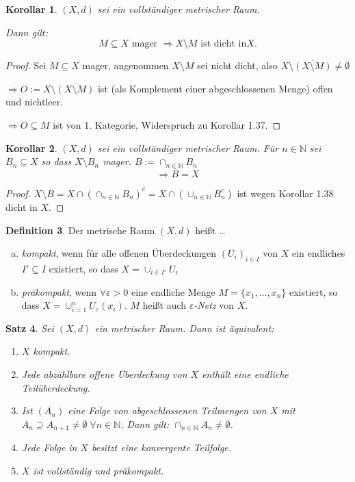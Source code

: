 \documentclass[ngerman]{report}
\theoremstyle{plain}%
\newtheorem{thm}{Satz}[chapter]
\newtheorem{cor}[thm]{Korollar}
\theoremstyle{definition}%
\newtheorem{definition}[thm]{Definition}
\theoremstyle{myStyle}
\newcommand{\N}{\mathbb{N}}
\newcommand{\df}[1][]{%
	\overset{#1}{\Rightarrow}
}
\begin{document}
\begin{cor}
	$(X,d)$ sei ein vollständiger metrischer Raum.\par 
	Dann gilt: 
	$$ M\subseteq X \text{ mager } \df X\setminus M \text{ ist dicht in} X.$$
\end{cor}
\begin{proof}
	Sei $M\subseteq X$ mager, angenommen $X\setminus M$ sei nicht dicht, also
	$X\setminus \overline{(X\setminus M)}\not= \emptyset$\par 
	$\df O:=X\setminus \overline{(X\setminus M)}$ ist (als Komplement einer abgeschlossenen Menge) offen und nichtleer.\par 
	$\df O \subseteq M$ ist von 1. Kategorie, Widerspruch zu Korollar 1.37.
\end{proof}

\begin{cor}
	$(X,d)$ sei ein vollständiger metrischer Raum. Für $n\in\N$ sei $B_n \subseteq X$ so dass $X\setminus B_n$ mager. $B:=\cap_{n\in\N}  B_n$
	$$\df \overline{B} = X$$
\end{cor}
\begin{proof}
	$X\setminus{B} = X\cap (\cap_{n\in\N} B_n)^c = X \cap (\cup_{n\in\N} B_n^c)$ ist wegen Korollar 1.38 dicht in $X$.
\end{proof}

\begin{definition}
	Der metrische Raum $(X,d)$ heißt \dots
	\begin{enumerate}[(a)]
	\item \textit{kompakt}, wenn für alle offenen Überdeckungen $(U_i)_{i\in I}$ von $X$ ein endliches $I'\subseteq I$ existiert, so dass $X = \cup_{i\in I'} U_i$
	
	\item \textit{präkompakt}, wenn $\forall \varepsilon > 0$ eine endliche Menge $M = \{x_1,\dots, x_n\}$ existiert, so dass $X = \cup^n_{i=1} U_\varepsilon (x_i)$. $M$ heißt auch $\varepsilon$\textit{-Netz} von $X$.
\end{enumerate}		
\end{definition}

\begin{thm}
	Sei $(X,d)$ ein metrischer Raum. Dann ist äquivalent:
	\begin{enumerate}[(1)]
		\item $X$ kompakt.
		\item Jede abzählbare offene Überdeckung von $X$ enthält eine endliche Teilüberdeckung.
		\item 
			Ist $(A_n)$ eine Folge von abgeschlossenen Teilmengen von $X$ mit $A_n \supseteq A_{n+1} \not = \emptyset\; \forall n\in\N$. Dann gilt: $\cap_{n\in\N}A_n \not = \emptyset$.
		\item Jede Folge in $X$ besitzt eine konvergente Teilfolge.
		\item $X$ ist vollständig und präkompakt.
	\end{enumerate}
\end{thm}
\end{document}

